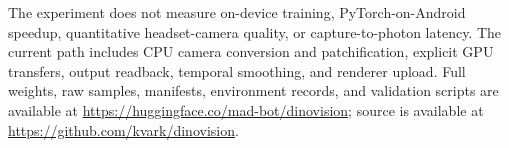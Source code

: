 The experiment does not measure on-device training, PyTorch-on-Android
speedup, quantitative headset-camera quality, or capture-to-photon latency.
The current path includes CPU camera conversion and patchification, explicit
GPU transfers, output readback, temporal smoothing, and renderer upload.
Full weights, raw samples, manifests, environment records, and validation
scripts are available at
\url{https://huggingface.co/mad-bot/dinovision}; source is available at
\url{https://github.com/kvark/dinovision}.
